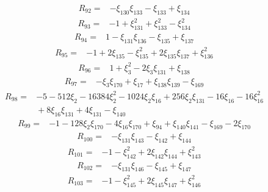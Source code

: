 \[
\begin{aligned}
 R_{92}={}&-\xi_{130}\xi_{133}-\xi_{133}+\xi_{134}
\end{aligned}
\]
\[
\begin{aligned}
 R_{93}={}&-1+\xi_{131}^{2}+\xi_{133}^{2}-\xi_{134}^{2}
\end{aligned}
\]
\[
\begin{aligned}
 R_{94}={}&1-\xi_{131}\xi_{136}-\xi_{135}+\xi_{137}
\end{aligned}
\]
\[
\begin{aligned}
 R_{95}={}&-1+2\xi_{135}-\xi_{135}^{2}+2\xi_{135}\xi_{137}+\xi_{136}^{2}
\end{aligned}
\]
\[
\begin{aligned}
 R_{96}={}&1+\xi_{3}^{2}-2\xi_{3}\xi_{131}+\xi_{138}
\end{aligned}
\]
\[
\begin{aligned}
 R_{97}={}&-\xi_{3}\xi_{170}+\xi_{17}+\xi_{138}\xi_{139}-\xi_{169}
\end{aligned}
\]
\[
\begin{aligned}
 R_{98}={}&-5-512\xi_{2}-16384\xi_{2}^{2}-1024\xi_{2}\xi_{16}+256\xi_{2}\xi_{131}-16\xi_{16}-16\xi_{16}^{2}\\
 &{}+8\xi_{16}\xi_{131}+4\xi_{131}-\xi_{140}
\end{aligned}
\]
\[
\begin{aligned}
 R_{99}={}&-1-128\xi_{2}\xi_{170}-4\xi_{16}\xi_{170}+\xi_{94}+\xi_{140}\xi_{141}-\xi_{169}-2\xi_{170}
\end{aligned}
\]
\[
\begin{aligned}
 R_{100}={}&-\xi_{131}\xi_{143}-\xi_{142}+\xi_{144}
\end{aligned}
\]
\[
\begin{aligned}
 R_{101}={}&-1-\xi_{142}^{2}+2\xi_{142}\xi_{144}+\xi_{143}^{2}
\end{aligned}
\]
\[
\begin{aligned}
 R_{102}={}&-\xi_{131}\xi_{146}-\xi_{145}+\xi_{147}
\end{aligned}
\]
\[
\begin{aligned}
 R_{103}={}&-1-\xi_{145}^{2}+2\xi_{145}\xi_{147}+\xi_{146}^{2}
\end{aligned}
\]
